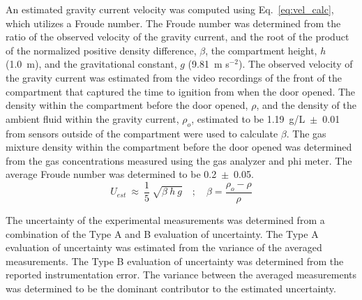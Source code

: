 \documentclass[12pt,letterpaper]{article}
\begin{document}
\begin{flushleft}
An estimated gravity current velocity was computed using Eq.~\eqref{eq:vel_calc}, which utilizes a Froude number. The Froude number was determined from the ratio of the observed velocity of the gravity current, and the root of the product of the normalized positive density difference, $\beta$, the compartment height, $h$ (1.0~m), and the gravitational constant, $g$ (9.81~m s$^{-2}$). The observed velocity of the gravity current was estimated from the video recordings of the front of the compartment that captured the time to ignition from when the door opened. The density within the compartment before the door opened, $\rho$, and the density of the ambient fluid within the gravity current, $\rho_{o}$, estimated to be 1.19~g/L~$\pm$~0.01 from sensors outside of the compartment were used to calculate $\beta$. The gas mixture density within the compartment before the door opened was determined from the gas concentrations measured using the gas analyzer and phi meter. The average Froude number was determined to be 0.2~$\pm$~0.05. 
\begin{equation}
\label{eq:vel_calc}
U_{est}~\approx~\frac{1}{5}~{\sqrt{\beta~h~g}} \quad ; \quad \beta=\frac{\rho_{o}-\rho}{\rho}
\end{equation}

The uncertainty of the experimental measurements was determined from a combination of the Type A and B evaluation of uncertainty. The Type A evaluation of uncertainty was estimated from the variance of the averaged measurements. The Type B evaluation of uncertainty was determined from the reported instrumentation error. The variance between the averaged measurements was determined to be the dominant contributor to the estimated uncertainty.


\end{flushleft}
\end{document}
